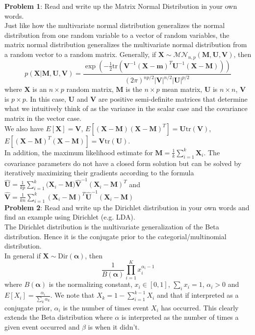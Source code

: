 \documentclass[12pt,letterpaper,cm]{hmcpset}
\begin{document}
\textbf{Problem 1}: Read and write up the Matrix Normal Distribution in your own words. \\
Just like how the multivariate normal distribution generalizes the normal distribution from one random variable to a vector of random variables, the matrix normal distribution generalizes the multivariate normal distribution from a random vector to a random matrix. 
Generally, if $\mathbf{X} \sim \mathcal{MN}_{n, p}(\mathbf{M}, \mathbf{U}, \mathbf{V})$, then $$p(\mathbf{X} | \mathbf{M}, \mathbf{U}, \mathbf{V}) = \frac{\exp(-\frac{1}{2} \text{tr}(\mathbf{V}^{-1}(\mathbf{X} - \mathbf{m})^T \mathbf{U}^{-1}(\mathbf{X} - \mathbf{M})))}{(2\pi)^{np/2} |\mathbf{V}|^{n/2}|\mathbf{U}|^{p/2}}$$ 
where $\mathbf{X}$ is an $n \times p$ random matrix, $\mathbf{M}$ is the $n \times p$ mean matrix, $\mathbf{U}$ is $n \times n$, $\mathbf{V}$ is $p \times p$. In this case, $\mathbf{U}$ and $\mathbf{V}$ are positive semi-definite matrices that determine what we intuitively think of as the variance in the scalar case and the covariance matrix in the vector case. \\
We also have $E[\mathbf{X}] = \mathbf{V}$, $E[(\mathbf{X} - \mathbf{M})(\mathbf{X} - \mathbf{M})^T] = \mathbf{U} \text{tr}(\mathbf{V})$, $E[(\mathbf{X} - \mathbf{M})^T(\mathbf{X} - \mathbf{M})] = \mathbf{V} \text{tr}(\mathbf{U})$. \\
In addition, the maximum likelihood estimate for $\hat{\mathbf{M}} = \frac{1}{k}\sum\limits_{i=1}^k \mathbf{X}_i$. The covariance parameters do not have a closed form solution but can be solved by iteratively maximizing their gradients according to the formula $\hat{\mathbf{U}} = \frac{1}{kp} \sum\limits_{i=1}^k(\mathbf{X}_i - \mathbf{M)} \hat{\mathbf{V}}^{-1} (\mathbf{X}_i - \mathbf{M})^T$ and \\ $\hat{\mathbf{V}} = \frac{1}{kn} \sum\limits_{i=1}^k(\mathbf{X}_i - \mathbf{M})^T \hat{\mathbf{U}}^{-1} (\mathbf{X}_i - \mathbf{M})$\\


\textbf{Problem 2}: Read and write up the Dirichlet distribution in your own words and find an example using Dirichlet (e.g. LDA). \\
The Dirichlet distribution is the multivariate generalization of the Beta distribution. Hence it is the conjugate prior to the categorial/multinomial distribution. \\
In general if $\mathbf{X} \sim \mbox{Dir}(\boldsymbol \alpha)$, then
$$ \frac{1}{B(\boldsymbol \alpha)} \prod\limits_{i=1}^Kx_{i}^{\alpha_i -1}$$
where $B(\boldsymbol{\alpha})$ is the normalizing constant, $x_i \in [0, 1]$, $\sum_i x_i = 1$, $\alpha_i > 0$ and $E[X_i] = \frac{\alpha_i}{\sum_k \alpha_k}$. We note that $X_k = 1 - \sum\limits_{i=1}^{k-1} X_i$ and that if interpreted as a conjugate prior, $\alpha_i$ is the number of times event $X_i$ has occurred. This clearly extends the Beta distribution where $\alpha$ is interpreted as the number of times a given event occurred and $\beta$ is when it didn't. \\
\end{document}
